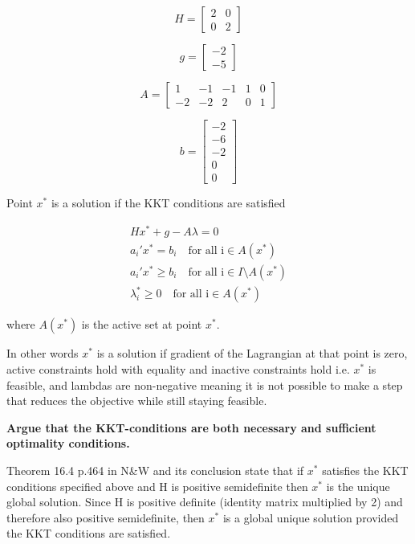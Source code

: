 \[H=\begin{bmatrix}
	2 & 0 \\
	0 & 2
    \end{bmatrix}
\]

\[g=\begin{bmatrix}
	-2 \\
	-5
    \end{bmatrix}
\]

\[A=\begin{bmatrix}
    1 & -1 & -1 & 1 & 0 \\
    -2 & -2 & 2 & 0 & 1 
    \end{bmatrix}
\]

\[b= \begin{bmatrix}
    -2 \\
    -6 \\
    -2 \\
    0 \\
    0
    \end{bmatrix}
\]



Point $x^*$ is a solution if the KKT conditions are satisfied

\begin{equation}
\begin{aligned}
    Hx^* + g - A \lambda = 0  \\
    a_{i}'x^* = b_i \quad \text{for all i} \in  A(x^*) \\
    a_{i}'x^* \geq b_i \quad \text{for all i} \in I \setminus A(x^*) \\
    \lambda_i^* \geq 0 \quad \text{for all i} \in A(x^*)
\end{aligned}
\end{equation}

where $A(x^*)$ is the active set at point $x^*$.

In other words $x^*$ is a solution if gradient of the Lagrangian at that point is zero, active constraints hold with equality and inactive constraints hold i.e. $x^*$ is feasible, and lambdas are non-negative meaning it is not possible to make a step that reduces the objective while still staying feasible. 


\textbf{Argue that the KKT-conditions are both necessary and sufficient optimality conditions.}

Theorem 16.4 p.464 in N\&W and its conclusion state that if $x^*$ satisfies the KKT conditions specified above and H is positive semidefinite then $x^*$ is the unique global solution. Since H is positive definite (identity matrix multiplied by 2) and therefore also positive semidefinite, then $x^*$ is a global unique solution provided the KKT conditions are satisfied.


